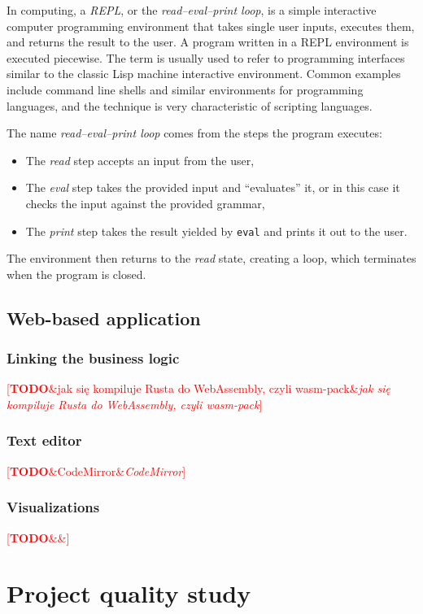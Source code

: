 \documentclass[english,engineering]{wizthesis}
\newcommand{\todo}[1]{%
  \textcolor{red}{[\textbf{TODO}\ifx&#1&{}\else{ }\fi\emph{#1}]}%
}
\begin{document}
In computing, a \emph{REPL}, or the \emph{read–eval–print loop}, is a simple
interactive computer programming environment that takes single user inputs,
executes them, and returns the result to the user. A program written in a REPL
environment is executed piecewise. The term is usually used to refer to
programming interfaces similar to the classic Lisp machine interactive
environment. Common examples include command line shells and similar
environments for programming languages, and the technique is very characteristic
of scripting languages.

The name \emph{read–eval–print loop} comes from the steps the program executes:
\begin{itemize}
  \item The \emph{read} step accepts an input from the user,
  \item The \emph{eval} step takes the provided input and ``evaluates'' it,
  or in this case it checks the input against the provided grammar,
  \item The \emph{print} step takes the result yielded by \texttt{eval} and
  prints it out to the user.
\end{itemize}
The environment then returns to the \emph{read} state, creating a loop, which
terminates when the program is closed.

\newpage

\section{Web-based application} \label{sec:web-based-application}

\subsection{Linking the business logic}

\todo{jak się kompiluje Rusta do WebAssembly, czyli wasm-pack}

\subsection{Text editor}

\todo{CodeMirror}

\subsection{Visualizations}

\todo{}

\chapter{Project quality study} \label{ch:project-quality-study}
\end{document}

